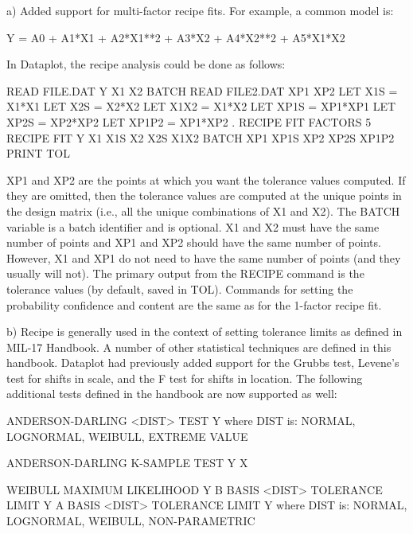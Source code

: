 {    a) Added support for multi-factor recipe fits.  For example,
       a common model is:

          Y = A0 + A1*X1 + A2*X1**2 + A3*X2 + A4*X2**2 + A5*X1*X2

       In Dataplot, the recipe analysis could be done as follows:

         READ FILE.DAT Y X1 X2 BATCH
         READ FILE2.DAT XP1 XP2
         LET X1S = X1*X1
         LET X2S = X2*X2
         LET X1X2 = X1*X2
         LET XP1S = XP1*XP1
         LET XP2S = XP2*XP2
         LET XP1P2 = XP1*XP2
         .
         RECIPE FIT FACTORS 5
         RECIPE FIT Y X1 X1S X2 X2S X1X2 BATCH XP1 XP1S XP2 XP2S XP1P2
         PRINT TOL

       XP1 and XP2 are the points at which you want the tolerance
       values computed.  If they are omitted, then the tolerance
       values are computed at the unique points in the design
       matrix (i.e., all the unique combinations of X1 and X2).
       The BATCH variable is a batch identifier and is optional.
       X1 and X2 must have the same number of points and XP1 and
       XP2 should have the same number of points.  However, X1 and
       XP1 do not need to have the same number of points (and they
       usually will not).  The primary output from the RECIPE command
       is the tolerance values (by default, saved in TOL).  Commands
       for setting the probability confidence and content are
       the same as for the 1-factor recipe fit.

    b) Recipe is generally used in the context of setting tolerance
       limits as defined in MIL-17 Handbook.  A number of other
       statistical techniques are defined in this handbook.
       Dataplot had previously added support for the Grubbs test,
       Levene's test for shifts in scale, and the F test for shifts
       in location.  The following additional tests defined in the
       handbook are now supported as well:
       
          ANDERSON-DARLING <DIST> TEST Y
          where DIST is: NORMAL, LOGNORMAL, WEIBULL, EXTREME VALUE

          ANDERSON-DARLING K-SAMPLE TEST Y X

          WEIBULL MAXIMUM LIKELIHOOD Y
          B BASIS <DIST> TOLERANCE LIMIT Y 
          A BASIS <DIST> TOLERANCE LIMIT Y 
          where DIST is: NORMAL, LOGNORMAL, WEIBULL, NON-PARAMETRIC
 
}

